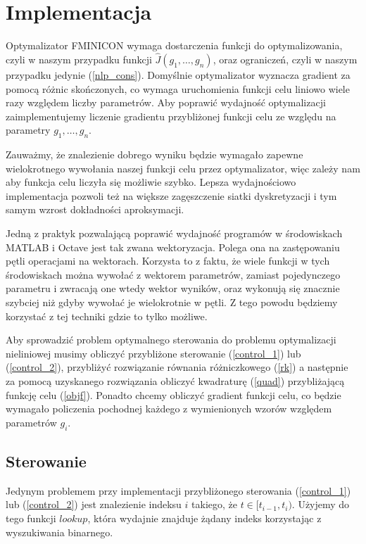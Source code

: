 \documentclass[11pt]{article}
\begin{document}
\section{Implementacja}
Optymalizator FMINICON wymaga dostarczenia funkcji do optymalizowania, czyli w naszym przypadku funkcji $\hat{J}(g_1,\ldots,g_n)$, oraz ograniczeń, czyli w naszym przypadku jedynie (\ref{nlp_cons}). Domyślnie optymalizator wyznacza gradient za pomocą różnic skończonych, co wymaga uruchomienia funkcji celu liniowo wiele razy względem liczby parametrów. Aby poprawić wydajność optymalizacji zaimplementujemy liczenie gradientu przybliżonej funkcji celu ze względu na parametry $g_1,\ldots, g_n$.

Zauważmy, że znalezienie dobrego wyniku będzie wymagało zapewne wielokrotnego wywołania naszej funkcji celu przez optymalizator, więc zależy nam aby funkcja celu liczyła się możliwie szybko. Lepsza wydajnościowo implementacja pozwoli też na większe zagęszczenie siatki dyskretyzacji i tym samym wzrost dokładności aproksymacji.

Jedną z praktyk pozwalającą poprawić wydajność programów w środowiskach MATLAB i Octave jest tak zwana wektoryzacja. Polega ona na zastępowaniu pętli operacjami na wektorach. Korzysta to z faktu, że wiele funkcji w tych środowiskach można wywołać z wektorem parametrów, zamiast pojedynczego parametru i zwracają one wtedy wektor wyników, oraz wykonują się znacznie szybciej niż gdyby wywołać je wielokrotnie w pętli. Z tego powodu będziemy korzystać z tej techniki gdzie to tylko możliwe.

Aby sprowadzić problem optymalnego sterowania do problemu optymalizacji nieliniowej musimy obliczyć przybliżone sterowanie (\ref{control_1}) lub (\ref{control_2}), przybliżyć rozwiązanie równania różniczkowego (\ref{rk}) a następnie za pomocą uzyskanego rozwiązania obliczyć kwadraturę (\ref{quad}) przybliżającą funkcję celu (\ref{objf}). Ponadto chcemy obliczyć gradient funkcji celu, co będzie wymagało policzenia pochodnej każdego z wymienionych wzorów względem parametrów $g_i$.

\subsection{Sterowanie}
Jedynym problemem przy implementacji przybliżonego sterowania (\ref{control_1}) lub (\ref{control_2}) jest znalezienie indeksu $i$ takiego, że $t \in [t_{i-1}, t_i)$. Użyjemy do tego funkcji $lookup$, która wydajnie znajduje żądany indeks korzystając z wyszukiwania binarnego.
\end{document}
